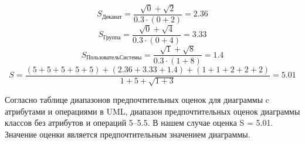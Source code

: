 \documentclass{article}
\begin{document}
$$S_{\text{Деканат}} = \frac{\sqrt{0} + \sqrt{2}}{0.3 \cdot (0 + 2)} = 2.36$$
$$S_{\text{Группа}} = \frac{\sqrt{0} + \sqrt{4}}{0.3 \cdot (0 + 4)} = 3.33$$
$$S_{\text{ПользовательСистемы}} = \frac{\sqrt{1} + \sqrt{8}}{0.3 \cdot (1 + 8)} = 1.4$$
$$S = \frac{(5 + 5 + 5 + 5 + 5) + (2.36 + 3.33 + 1.4) + (1 + 1 + 2 + 2 + 2)}{1 + 5 + \sqrt{1 + 3}} = 5.01$$

Согласно таблице диапазонов предпочтительных оценок для диаграммы c атрибутами и операциями в UML, диапазон предпочтительных оценок диаграммы классов без атрибутов и операций 5–5.5. В нашем случае оценка S = 5.01. Значение оценки является предпочтительным значением диаграммы.
\end{document}
